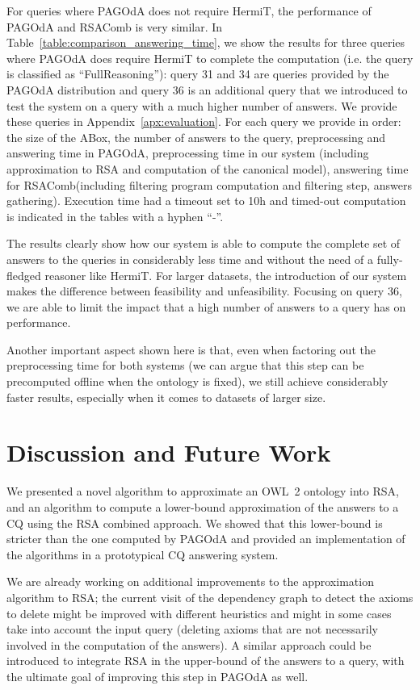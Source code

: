 \documentclass[runningheads]{llncs}
\newcommand{\pagoda}{\mbox{PAGOdA}\xspace}
\newcommand{\hermit}{\mbox{HermiT}\xspace}
\newcommand{\rsacomb}{\mbox{RSAComb}\xspace}
\begin{document}
For queries where \pagoda does not require \hermit, the performance of \pagoda and \rsacomb is very similar.
In Table~\ref{table:comparison_answering_time}, we show the results for three queries where \pagoda does require \hermit to complete the computation (i.e. the query is classified as ``FullReasoning''): query 31 and 34 are queries provided by the \pagoda distribution and query 36 is an additional query that we introduced to test the system on a query with a much higher number of answers.
We provide these queries in Appendix~\ref{apx:evaluation}.
For each query we provide in order: the size of the ABox, the number of answers to the query, preprocessing and answering time in \pagoda, preprocessing time in our system (including approximation to RSA and computation of the canonical model), answering time for \rsacomb (including filtering program computation and filtering step, answers gathering).
Execution time had a timeout set to 10h and timed-out computation is indicated in the tables with a hyphen ``-''.

The results clearly show how our system is able to compute the complete set of answers to the queries in considerably less time and without the need of a fully-fledged reasoner like \hermit.
For larger datasets, the introduction of our system makes the difference between feasibility and unfeasibility.
Focusing on query 36, we are able to limit the impact that a high number of answers to a query has on performance.

Another important aspect shown here is that, even when factoring out the preprocessing time for both systems (we can argue that this step can be precomputed offline when the ontology is fixed), we still achieve considerably faster results, especially when it comes to datasets of larger size.

\section{Discussion and Future Work}\label{sec:future_work}

We presented a novel algorithm to approximate an OWL~2 ontology into RSA, and an algorithm to compute a lower-bound approximation of the answers to a CQ using the RSA combined approach.
We showed that this lower-bound is stricter than the one computed by \pagoda and provided an implementation of the algorithms in a prototypical CQ answering system.

We are already working on additional improvements to the approximation algorithm to RSA;
the current visit of the dependency graph to detect the axioms to delete might be improved with different heuristics and might in some cases take into account the input query (deleting axioms that are not necessarily involved in the computation of the answers).
A similar approach could be introduced to integrate RSA in the upper-bound of the answers to a query, with the ultimate goal of improving this step in \pagoda as well.
\end{document}
